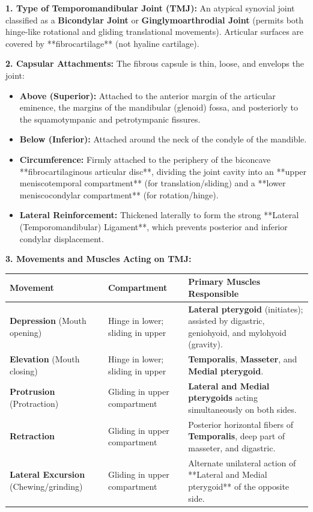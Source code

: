 \documentclass[11pt,a4paper]{article}
\begin{document}
\begin{ansbox}
\textbf{1. Type of Temporomandibular Joint (TMJ):}
An atypical synovial joint classified as a \textbf{Bicondylar Joint} or \textbf{Ginglymoarthrodial Joint} (permits both hinge-like rotational and gliding translational movements). Articular surfaces are covered by **fibrocartilage** (not hyaline cartilage).

\textbf{2. Capsular Attachments:}
The fibrous capsule is thin, loose, and envelops the joint:
\begin{itemize}[leftmargin=*]
    \item \textbf{Above (Superior):} Attached to the anterior margin of the articular eminence, the margins of the mandibular (glenoid) fossa, and posteriorly to the squamotympanic and petrotympanic fissures.
    \item \textbf{Below (Inferior):} Attached around the neck of the condyle of the mandible.
    \item \textbf{Circumference:} Firmly attached to the periphery of the biconcave **fibrocartilaginous articular disc**, dividing the joint cavity into an **upper meniscotemporal compartment** (for translation/sliding) and a **lower meniscocondylar compartment** (for rotation/hinge).
    \item \textbf{Lateral Reinforcement:} Thickened laterally to form the strong **Lateral (Temporomandibular) Ligament**, which prevents posterior and inferior condylar displacement.
\end{itemize}

\textbf{3. Movements and Muscles Acting on TMJ:}
\begin{center}
\begin{tabularx}{\textwidth}{p{3.5cm}p{4cm}X}
\toprule
\textbf{Movement} & \textbf{Compartment} & \textbf{Primary Muscles Responsible} \\
\midrule
\textbf{Depression} (Mouth opening) & Hinge in lower; sliding in upper & \textbf{Lateral pterygoid} (initiates); assisted by digastric, geniohyoid, and mylohyoid (gravity). \\
\textbf{Elevation} (Mouth closing) & Hinge in lower; sliding in upper & \textbf{Temporalis}, \textbf{Masseter}, and \textbf{Medial pterygoid}. \\
\textbf{Protrusion} (Protraction) & Gliding in upper compartment & \textbf{Lateral and Medial pterygoids} acting simultaneously on both sides. \\
\textbf{Retraction} & Gliding in upper compartment & Posterior horizontal fibers of \textbf{Temporalis}, deep part of masseter, and digastric. \\
\textbf{Lateral Excursion} (Chewing/grinding) & Gliding in upper compartment & Alternate unilateral action of **Lateral and Medial pterygoid** of the opposite side. \\
\bottomrule
\end{tabularx}
\end{center}
\end{ansbox}
\end{document}
